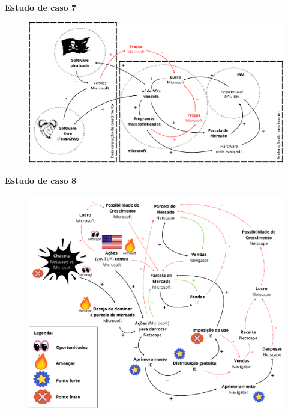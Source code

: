 \documentclass[11pt]{article}
\begin{document}
\begin{enumerate}
        \textbf{Estudo de caso 7}\par
        \begin{figure}[!h]
            \centering
            \includegraphics[width=0.90\linewidth]{img/diagrama1-ec7.png}
        \end{figure}
\pagebreak
        \textbf{Estudo de caso 8}\par
        \begin{figure}[!ht]
            \centering
            \includegraphics[width=0.95\linewidth]{img/diagrama2-ec8.png}
        \end{figure}

\end{enumerate}
\end{document}
